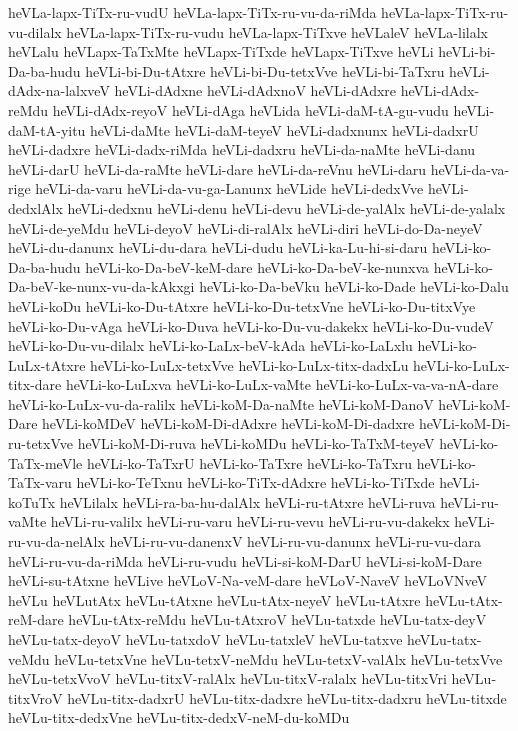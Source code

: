 {heVLa-lapx-TiTx-ru-vudU
heVLa-lapx-TiTx-ru-vu-da-riMda
heVLa-lapx-TiTx-ru-vu-dilalx
heVLa-lapx-TiTx-ru-vudu
heVLa-lapx-TiTxve
heVLaleV
heVLa-lilalx
heVLalu
heVLapx-TaTxMte
heVLapx-TiTxde
heVLapx-TiTxve
heVLi
heVLi-bi-Da-ba-hudu
heVLi-bi-Du-tAtxre
heVLi-bi-Du-tetxVve
heVLi-bi-TaTxru
heVLi-dAdx-na-lalxveV
heVLi-dAdxne
heVLi-dAdxnoV
heVLi-dAdxre
heVLi-dAdx-reMdu
heVLi-dAdx-reyoV
heVLi-dAga
heVLida
heVLi-daM-tA-gu-vudu
heVLi-daM-tA-yitu
heVLi-daMte
heVLi-daM-teyeV
heVLi-dadxnunx
heVLi-dadxrU
heVLi-dadxre
heVLi-dadx-riMda
heVLi-dadxru
heVLi-da-naMte
heVLi-danu
heVLi-darU
heVLi-da-raMte
heVLi-dare
heVLi-da-reVnu
heVLi-daru
heVLi-da-va-rige
heVLi-da-varu
heVLi-da-vu-ga-Lanunx
heVLide
heVLi-dedxVve
heVLi-dedxlAlx
heVLi-dedxnu
heVLi-denu
heVLi-devu
heVLi-de-yalAlx
heVLi-de-yalalx
heVLi-de-yeMdu
heVLi-deyoV
heVLi-di-ralAlx
heVLi-diri
heVLi-do-Da-neyeV
heVLi-du-danunx
heVLi-du-dara
heVLi-dudu
heVLi-ka-Lu-hi-si-daru
heVLi-ko-Da-ba-hudu
heVLi-ko-Da-beV-keM-dare
heVLi-ko-Da-beV-ke-nunxva
heVLi-ko-Da-beV-ke-nunx-vu-da-kAkxgi
heVLi-ko-Da-beVku
heVLi-ko-Dade
heVLi-ko-Dalu
heVLi-koDu
heVLi-ko-Du-tAtxre
heVLi-ko-Du-tetxVne
heVLi-ko-Du-titxVye
heVLi-ko-Du-vAga
heVLi-ko-Duva
heVLi-ko-Du-vu-dakekx
heVLi-ko-Du-vudeV
heVLi-ko-Du-vu-dilalx
heVLi-ko-LaLx-beV-kAda
heVLi-ko-LaLxlu
heVLi-ko-LuLx-tAtxre
heVLi-ko-LuLx-tetxVve
heVLi-ko-LuLx-titx-dadxLu
heVLi-ko-LuLx-titx-dare
heVLi-ko-LuLxva
heVLi-ko-LuLx-vaMte
heVLi-ko-LuLx-va-va-nA-dare
heVLi-ko-LuLx-vu-da-ralilx
heVLi-koM-Da-naMte
heVLi-koM-DanoV
heVLi-koM-Dare
heVLi-koMDeV
heVLi-koM-Di-dAdxre
heVLi-koM-Di-dadxre
heVLi-koM-Di-ru-tetxVve
heVLi-koM-Di-ruva
heVLi-koMDu
heVLi-ko-TaTxM-teyeV
heVLi-ko-TaTx-meVle
heVLi-ko-TaTxrU
heVLi-ko-TaTxre
heVLi-ko-TaTxru
heVLi-ko-TaTx-varu
heVLi-ko-TeTxnu
heVLi-ko-TiTx-dAdxre
heVLi-ko-TiTxde
heVLi-koTuTx
heVLilalx
heVLi-ra-ba-hu-dalAlx
heVLi-ru-tAtxre
heVLi-ruva
heVLi-ru-vaMte
heVLi-ru-valilx
heVLi-ru-varu
heVLi-ru-vevu
heVLi-ru-vu-dakekx
heVLi-ru-vu-da-nelAlx
heVLi-ru-vu-danenxV
heVLi-ru-vu-danunx
heVLi-ru-vu-dara
heVLi-ru-vu-da-riMda
heVLi-ru-vudu
heVLi-si-koM-DarU
heVLi-si-koM-Dare
heVLi-su-tAtxne
heVLive
heVLoV-Na-veM-dare
heVLoV-NaveV
heVLoVNveV
heVLu
heVLutAtx
heVLu-tAtxne
heVLu-tAtx-neyeV
heVLu-tAtxre
heVLu-tAtx-reM-dare
heVLu-tAtx-reMdu
heVLu-tAtxroV
heVLu-tatxde
heVLu-tatx-deyV
heVLu-tatx-deyoV
heVLu-tatxdoV
heVLu-tatxleV
heVLu-tatxve
heVLu-tatx-veMdu
heVLu-tetxVne
heVLu-tetxV-neMdu
heVLu-tetxV-valAlx
heVLu-tetxVve
heVLu-tetxVvoV
heVLu-titxV-ralAlx
heVLu-titxV-ralalx
heVLu-titxVri
heVLu-titxVroV
heVLu-titx-dadxrU
heVLu-titx-dadxre
heVLu-titx-dadxru
heVLu-titxde
heVLu-titx-dedxVne
heVLu-titx-dedxV-neM-du-koMDu
}
